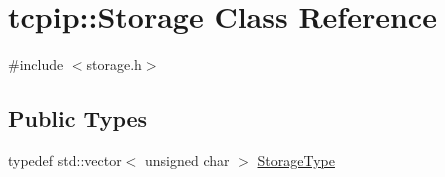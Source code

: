 \hypertarget{classtcpip_1_1_storage}{}\section{tcpip\+:\+:Storage Class Reference}
\label{classtcpip_1_1_storage}


{\ttfamily \#include $<$storage.\+h$>$}

\subsection*{Public Types}
\begin{DoxyCompactItemize}
\item 
typedef std\+::vector$<$ unsigned char $>$ \hyperlink{classtcpip_1_1_storage_a087e7b1151a2642cb782b5a6bdc25576}{Storage\+Type}
\end{DoxyCompactItemize}
